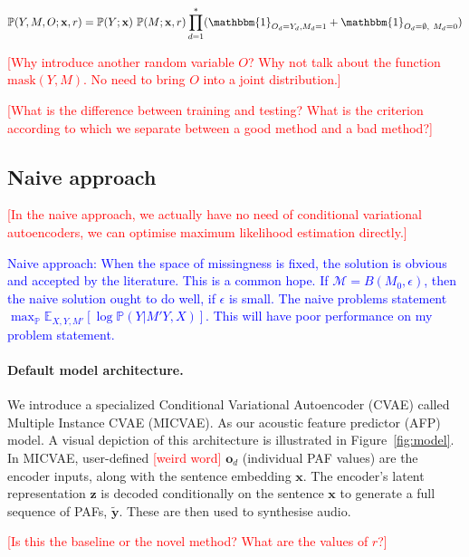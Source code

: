 \documentclass[a4paper,12pt,twoside,openright]{article}
\newcommand{\crit}[1]{\textcolor{red}{#1}}
\newcommand{\draft}[1]{\textcolor{blue}{#1}}
\begin{document}
\[
    \mathbb{P} (Y, M, O; \mathbf{x}, r) = \mathbb{P} (Y; \mathbf{x}) ~ \mathbb{P} (M; \mathbf{x}, r) \prod_{d=1}^* (\mathbbm{1}_{O_d = Y_d, M_d = 1} + \mathbbm{1}_{O_d = \emptyset, ~ M_d = 0})
\]

\crit{[Why introduce another random variable $O$? Why not talk about the function $\mathrm{mask}(Y, M)$. No need to bring $O$ into a joint distribution.]}

\crit{[What is the difference between training and testing? What is the criterion according to which we separate between a good method and a bad method?]}

\subsection{Naive approach}

\crit{[In the naive approach, we actually have no need of conditional variational autoencoders, we can optimise maximum likelihood estimation directly.]}

\draft{Naive approach: When the space of missingness is fixed, the solution is obvious and accepted by the literature. This is a common hope. If $\mathcal{M} = B(M_0, \epsilon)$, then the naive solution ought to do well, if $\epsilon$ is small. The naive problems statement $\max_{\mathbb{P}} \mathbb{E}_{X,Y,M'} [\log \mathbb{P}(Y| M'Y,X)]$. This will have poor performance on my problem statement.}

\paragraph{Default model architecture.} We introduce a specialized Conditional Variational Autoencoder (CVAE) \parencite{conditional-VAE:2015} called Multiple Instance CVAE (MICVAE). As our acoustic feature predictor (AFP) model. A visual depiction of this architecture is illustrated in Figure~\ref{fig:model}. In MICVAE, user-defined \crit{[weird word]} $\mathbf{o}_d$ (individual PAF values) are the encoder inputs, along with the sentence embedding $\mathbf{x}$. The encoder's latent representation $\mathbf{z}$ is decoded conditionally on the sentence $\mathbf{x}$ to generate a full sequence of PAFs, $\tilde{\mathbf{y}}$. These are then used to synthesise audio.

\crit{[Is this the baseline or the novel method? What are the values of $r$?]}

\end{document}
